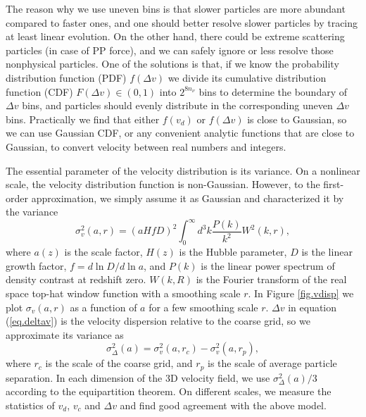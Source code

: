 \documentclass[10pt,twocolumn,preprint]{emulateapj}
\begin{document}
The reason why we use uneven bins is that slower particles are more abundant compared to faster ones, and one should better resolve slower particles by tracing at least linear evolution. On the other hand, there could be extreme scattering particles (in case of PP force), and we can safely ignore or less resolve those nonphysical particles. One of the solutions is that, if we know the probability distribution function (PDF) $f(\Delta v)$ we divide its cumulative distribution function (CDF) $F(\Delta v)\in(0,1)$ into $2^{8n_\nu}$ bins to determine the boundary of $\Delta v$ bins, and particles should evenly distribute in the corresponding uneven $\Delta v$ bins. Practically we find that either $f(v_d)$ or $f(\Delta v)$ is close to Gaussian, so we can use Gaussian CDF, or any convenient analytic functions that are close to Gaussian, to convert velocity between real numbers and integers.

The essential parameter of the velocity distribution is its variance. On a nonlinear scale, the velocity distribution function is non-Gaussian. However, to the first-order approximation, we simply assume it as Gaussian and characterized it by the variance
\begin{equation}\label{eq.vdisp}
	\sigma^2_v(a,r) = (a H f D)^2 \int_0^\infty d^3k\frac{P(k)}{k^2}W^2(k,r),
\end{equation}
where $a(z)$ is the scale factor, $H(z)$ is the Hubble parameter, $D$ is the linear growth factor, $f=d \ln D/d\ln a$, and $P(k)$ is the linear power spectrum of density contrast at redshift zero. $W(k,R)$ is the Fourier transform of the real space top-hat window function with a smoothing scale $r$. In Figure \ref{fig.vdisp} we plot $\sigma_v(a,r)$ as a function of $a$ for a few smoothing scale $r$. $\Delta v$ in equation (\ref{eq.deltav}) is the velocity dispersion relative to the coarse grid, so we approximate its variance as
\begin{equation}\label{eq.vdelta}
	\sigma^2_{\Delta}(a)=\sigma^2_v(a,r_c)-\sigma^2_v(a,r_p),
\end{equation}
where $r_c$ is the scale of the coarse grid, and $r_p$ is the scale of average particle separation. In each dimension of the 3D velocity field, we use $\sigma^2_{\Delta}(a)/3$ according to the equipartition theorem. On different scales, we measure the statistics of $v_d$, $v_c$ and $\Delta v$ and find good agreement with the above model.
\end{document}
